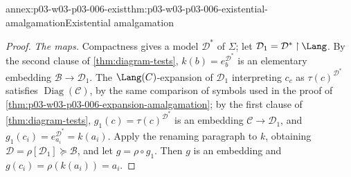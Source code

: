 \begin{annexitem}{annex:p03-w03-p03-006-exist}{thm:p03-w03-p03-006-existential-amalgamation}{Existential amalgamation}
\begin{proof}
\emph{The maps.}  Compactness gives a model \(\mathcal D^*\) of
\(\Sigma\); let \(\mathcal D_1=\mathcal D^*\mathbin{\upharpoonright}\Lang\).
By the second clause of \cref{thm:diagram-tests}, \(k(b)=e_b^{\mathcal D^*}\)
is an elementary embedding \(\mathcal B\to\mathcal D_1\).  The
\(\Lang(C)\)-expansion of \(\mathcal D_1\) interpreting \(c_c\) as
\(\tau(c)^{\mathcal D^*}\) satisfies \(\operatorname{Diag}(\mathcal C)\),
by the same comparison of symbols used in the proof of
\cref{thm:p03-w03-p03-006-expansion-amalgamation}; by the first clause of
\cref{thm:diagram-tests}, \(g_1(c)=\tau(c)^{\mathcal D^*}\) is an
embedding \(\mathcal C\to\mathcal D_1\), and
\(g_1(c_i)=e_{a_i}^{\mathcal D^*}=k(a_i)\).  Apply the renaming paragraph
to \(k\), obtaining \(\mathcal D=\rho[\mathcal D_1]\succcurlyeq\mathcal B\),
and let \(g=\rho\circ g_1\).  Then \(g\) is an embedding and
\(g(c_i)=\rho(k(a_i))=a_i\).
\end{proof}
\end{annexitem}

